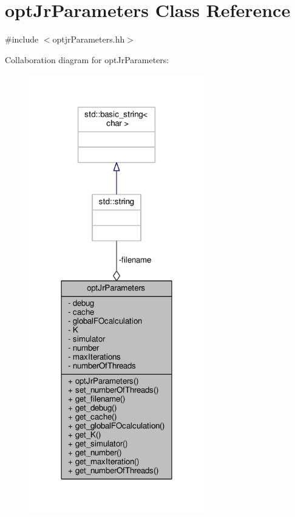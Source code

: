 \hypertarget{classoptJrParameters}{\section{opt\-Jr\-Parameters Class Reference}
\label{classoptJrParameters}
}


{\ttfamily \#include $<$optjr\-Parameters.\-hh$>$}



Collaboration diagram for opt\-Jr\-Parameters\-:\nopagebreak
\begin{figure}[H]
\begin{center}
\leavevmode
\includegraphics[width=216pt]{classoptJrParameters__coll__graph}
\end{center}
\end{figure}
